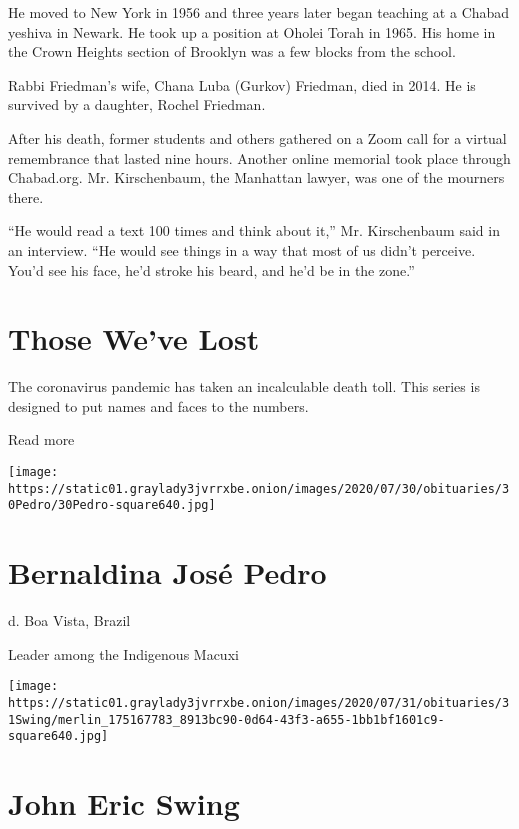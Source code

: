 He moved to New York in 1956 and three years later began teaching at a
Chabad yeshiva in Newark. He took up a position at Oholei Torah in 1965.
His home in the Crown Heights section of Brooklyn was a few blocks from
the school.

Rabbi Friedman's wife, Chana Luba (Gurkov) Friedman, died in 2014. He is
survived by a daughter, Rochel Friedman.

After his death, former students and others gathered on a Zoom call for
a virtual remembrance that lasted nine hours. Another online memorial
took place through Chabad.org. Mr. Kirschenbaum, the Manhattan lawyer,
was one of the mourners there.

``He would read a text 100 times and think about it,'' Mr. Kirschenbaum
said in an interview. ``He would see things in a way that most of us
didn't perceive. You'd see his face, he'd stroke his beard, and he'd be
in the zone.''

\href{https://www.nytimes3xbfgragh.onion/interactive/2020/obituaries/people-died-coronavirus-obituaries.html?action=click\&pgtype=Article\&state=default\&region=BELOW_MAIN_CONTENT\&context=covid_obits_promo}{}

\hypertarget{those-weve-lost}{%
\section{Those We've Lost}\label{those-weve-lost}}

The coronavirus pandemic has taken an incalculable death toll. This
series is designed to put names and faces to the numbers.

Read more

\texttt{[image: https://static01.graylady3jvrrxbe.onion/images/2020/07/30/obituaries/30Pedro/30Pedro-square640.jpg]}

\hypertarget{bernaldina-josuxe9-pedro}{%
\section{Bernaldina José Pedro}\label{bernaldina-josuxe9-pedro}}

d. Boa Vista, Brazil

Leader among the Indigenous Macuxi

\texttt{[image: https://static01.graylady3jvrrxbe.onion/images/2020/07/31/obituaries/31Swing/merlin\_175167783\_8913bc90-0d64-43f3-a655-1bb1bf1601c9-square640.jpg]}

\hypertarget{john-eric-swing}{%
\section{John Eric Swing}\label{john-eric-swing}}

